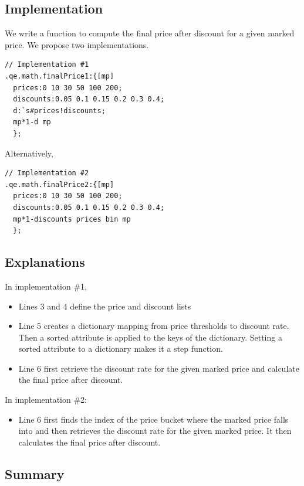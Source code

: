 \subsection{Implementation}
We write a function to compute the final price after discount for a given marked price. We propose two implementations.

\begin{verbatim}
// Implementation #1
.qe.math.finalPrice1:{[mp]
  prices:0 10 30 50 100 200;
  discounts:0.05 0.1 0.15 0.2 0.3 0.4;
  d:`s#prices!discounts;
  mp*1-d mp
  };
\end{verbatim}

Alternatively,
\begin{verbatim}
// Implementation #2
.qe.math.finalPrice2:{[mp]
  prices:0 10 30 50 100 200;
  discounts:0.05 0.1 0.15 0.2 0.3 0.4;
  mp*1-discounts prices bin mp
  };
\end{verbatim}

\subsection{Explanations}
In implementation \#1,

\begin{itemize}
\item Lines 3 and 4 define the price and discount lists
\item Line 5 creates a dictionary mapping from price thresholds to discount rate. Then a sorted attribute is applied to the keys of the dictionary. Setting a sorted attribute to a dictionary makes it a step function.
\item Line 6 first retrieve the discount rate for the given marked price and calculate the final price after discount.
\end{itemize}

In implementation \#2:

\begin{itemize}
\item Line 6 first finds the index of the price bucket where the marked price falls into and then retrieves the discount rate for the given marked price. It then calculates the final price after discount.
\end{itemize}

\subsection{Summary}

